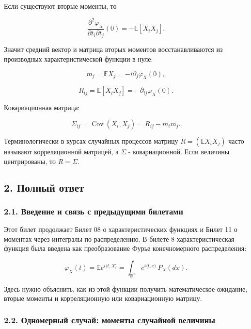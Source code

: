 \documentclass[
  11pt,
  a4paper,
]{article}
\begin{document}
Если существуют вторые моменты, то

\[
\frac{\partial^2\varphi_X}{\partial t_i\partial t_j}(0)
=
-\mathbb E[X_iX_j].
\]

Значит средний вектор и матрица вторых моментов восстанавливаются из
производных характеристической функции в нуле:

\[
m_j=\mathbb EX_j=-i\partial_j\varphi_X(0),
\]

\[
R_{ij}=\mathbb E[X_iX_j]=-\partial_{ij}\varphi_X(0).
\]

Ковариационная матрица:

\[
\Sigma_{ij}
=
\operatorname{Cov}(X_i,X_j)
=
R_{ij}-m_im_j.
\]

Терминологически в курсах случайных процессов матрицу
\(R=(\mathbb E X_iX_j)\) часто называют корреляционной матрицей, а
\(\Sigma\) - ковариационной. Если величины центрированы, то
\(R=\Sigma\).

\subsection{2. Полный
ответ}\label{ux43fux43eux43bux43dux44bux439-ux43eux442ux432ux435ux442}

\subsubsection{2.1. Введение и связь с предыдущими
билетами}\label{ux432ux432ux435ux434ux435ux43dux438ux435-ux438-ux441ux432ux44fux437ux44c-ux441-ux43fux440ux435ux434ux44bux434ux443ux449ux438ux43cux438-ux431ux438ux43bux435ux442ux430ux43cux438}

Этот билет продолжает Билет 08 о характеристических функциях и Билет 11
о моментах через интегралы по распределению. В билете 8
характеристическая функция была введена как преобразование Фурье
конечномерного распределения:

\[
\varphi_X(t)
=
\mathbb E e^{i\langle t,X\rangle}
=
\int_{\mathbb R^n} e^{i\langle t,x\rangle}\,P_X(dx).
\]

Здесь нужно объяснить, как из этой функции получить математическое
ожидание, вторые моменты и корреляционную или ковариационную матрицу.

\subsubsection{2.2. Одномерный случай: моменты случайной
величины}\label{ux43eux434ux43dux43eux43cux435ux440ux43dux44bux439-ux441ux43bux443ux447ux430ux439-ux43cux43eux43cux435ux43dux442ux44b-ux441ux43bux443ux447ux430ux439ux43dux43eux439-ux432ux435ux43bux438ux447ux438ux43dux44b}
\end{document}
